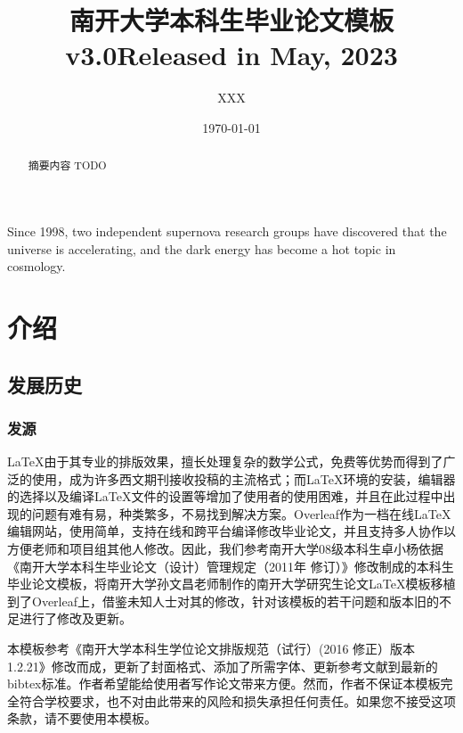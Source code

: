 \documentclass{nktba}
\title{南开大学本科生毕业论文模板\\ v3.0}
\title*{Released in May, 2023}
\author{XXX}
\date{\today}
\begin{document}

\maketitle
\begin{titlepage}
  \declaration
\end{titlepage}

\begin{abstract}
摘要内容 TODO
\end{abstract}
  
\begin{abstract*}
Since 1998, two independent supernova research groups have discovered that the universe is accelerating, and the dark energy has become a hot topic in cosmology. 
\end{abstract*}

\tableofcontents


\section{介绍}

\subsection{发展历史}

\subsubsection{发源}

\LaTeX 由于其专业的排版效果，擅长处理复杂的数学公式，免费等优势而得到了广泛的使用，成为许多西文期刊接收投稿的主流格式；而\LaTeX 环境的安装，编辑器的选择以及编译\LaTeX 文件的设置等增加了使用者的使用困难，并且在此过程中出现的问题有难有易，种类繁多，不易找到解决方案。Overleaf作为一档在线\LaTeX 编辑网站，使用简单，支持在线和跨平台编译修改毕业论文，并且支持多人协作以方便老师和项目组其他人修改。因此，我们参考南开大学08级本科生卓小杨依据《南开大学本科生毕业论文（设计）管理规定（2011年 修订）》修改制成的本科生毕业论文模板，将南开大学孙文昌老师制作的南开大学研究生论文\LaTeX 模板移植到了Overleaf上，借鉴未知人士对其的修改，针对该模板的若干问题和版本旧的不足进行了修改及更新。

本模板参考《南开大学本科生学位论文排版规范（试行）(2016 修正）版本 1.2.21》修改而成，更新了封面格式、添加了所需字体、更新参考文献到最新的bibtex标准。作者希望能给使用者写作论文带来方便。然而，作者不保证本模板完全符合学校要求，也不对由此带来的风险和损失承担任何责任。如果您不接受这项条款，请不要使用本模板。
\end{document}
